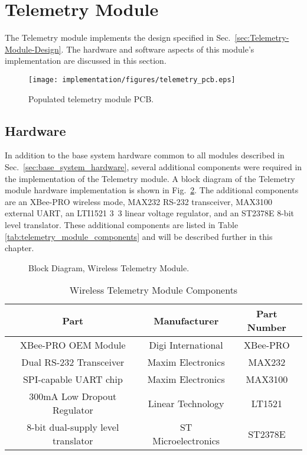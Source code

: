 \section{Telemetry Module}

The Telemetry module implements the design specified in Sec.\ \ref{sec:Telemetry-Module-Design}. The hardware and software aspects of this module's implementation are discussed in this section.

\begin{figure}[H]
\centering
\texttt{[image: implementation/figures/telemetry\_pcb.eps]}
\caption{Populated telemetry module PCB.}\label{fig:telemetry_pcb}
\end{figure}

\subsection{Hardware}

In addition to the base system hardware common to all modules described in Sec.\ \ref{sec:base_system_hardware}, several additional components were required in the implementation of the Telemetry module. A block diagram of the Telemetry module hardware implementation is shown in Fig.\ \ref{fig:telemetry_hardware_block}. The additional components are an XBee-PRO wireless mode, MAX232 RS-232 transceiver, MAX3100 external UART, an LTI1521 \unit{3.3}{\volt} linear voltage regulator, and an ST2378E 8-bit level translator. These additional components are listed in Table \ref{tab:telemetry_module_components} and will be described further in this chapter.

\begin{figure}[H]
\centering

\caption{Block Diagram, Wireless Telemetry Module.\label{fig:telemetry_hardware_block}}
\end{figure}

\begin{table}[H]
  \caption{Wireless Telemetry Module Components\label{tab:telmetry_module_components}}
  \centering
    \begin{tabular}{|c|c|c|}
      \hline 
      Part & Manufacturer & Part Number\tabularnewline
      \hline
      \hline
      XBee-PRO OEM Module & Digi International & XBee-PRO\tabularnewline
      \hline 
      Dual RS-232 Transceiver & Maxim Electronics & MAX232\tabularnewline
      \hline 
      SPI-capable UART chip & Maxim Electronics & MAX3100\tabularnewline
      \hline 
      300mA Low Dropout Regulator & Linear Technology & LT1521\tabularnewline
      \hline
      8-bit dual-supply level translator & ST Microelectronics & ST2378E\tabularnewline
      \hline
    \end{tabular}
\end{table}

